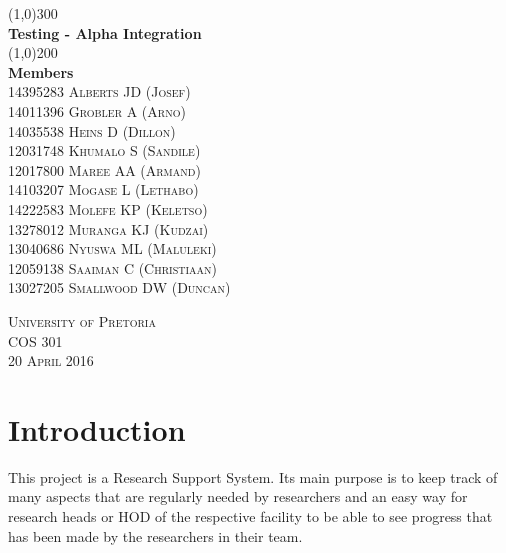 \documentclass{article}
\begin{document}
\begin{titlepage}
	\begin{center}
		\line(1,0){300}\\
		[6mm]
		\huge{\bfseries Testing - Alpha Integration}\\
		[2mm]
		\line(1,0){200}\\
		[15mm]
		\textbf{\huge Members}\\
		[7.5mm]
		\textsc{
                \large 14395283	Alberts	JD (Josef)\\
                14011396	Grobler	A (Arno) \\
				14035538	Heins	D (Dillon)\\
				12031748	Khumalo	S (Sandile)\\
				12017800	Maree	AA (Armand)\\
                14103207	Mogase	L (Lethabo)\\
                14222583	Molefe	KP (Keletso)\\
                13278012	Muranga	KJ (Kudzai)\\
                13040686	Nyuswa	ML (Maluleki)\\
                12059138	Saaiman	C (Christiaan)\\
                13027205	Smallwood	DW (Duncan)\\[8cm]
            }
    \end{center}

    \begin{flushright}
        \textsc{\large University of Pretoria\\
        COS 301\\
        20 April 2016\\}
    \end{flushright}
\end{titlepage}

\tableofcontents
\thispagestyle{empty}
\cleardoublepage
%

\setcounter{page}{1}
%

\section{Introduction}\label{sec:intro}
    This project is a Research Support System. Its main purpose is to keep track of many aspects that are regularly needed by researchers and an easy way for research heads or HOD of the respective facility to be able to see progress that has been made by the researchers in their team.
    
\end{document}
